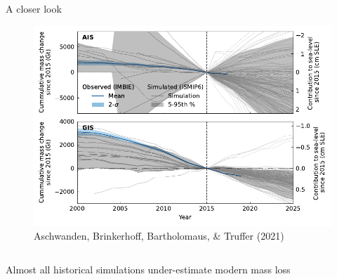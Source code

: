 \documentclass[hide notes,intlimits]{beamer}
\begin{document}
\begin{frame}{A closer look}
  \begin{figure}
    \includegraphics[width=\textwidth]{IS_Historical}
    \caption{Aschwanden, Brinkerhoff, Bartholomaus, \& Truffer (2021)}
  \end{figure}
  \begin{columns}[c]
    \begin{column}{.5\textwidth}
      \begin{minipage}[t][.5\textheight][t]{\textwidth}
        \alert{Almost all historical simulations under-estimate modern mass loss}
      \end{minipage}
    \end{column}
    \begin{column}{.25\textwidth}
    \end{column}
  \end{columns}
\end{frame}
\end{document}
